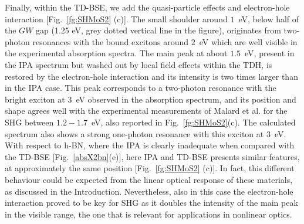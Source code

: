 Finally, within the TD-BSE, we add the quasi-particle effects and electron-hole interaction  [Fig.~\ref{fg:SHMoS2} (c)]. The small shoulder around $1$~eV, below half of the $GW$ gap (1.25 eV, grey dotted vertical line in the figure), originates from two-photon resonances with the bound excitons around $2$~eV which are well visible in the experimental absorption spectra.\cite{PhysRevLett.105.136805}  The main peak at about $1.5$~eV, present in the IPA spectrum but washed out by local field effects within the TDH, is restored by the electron-hole interaction and its intensity is two times larger than in the IPA case. This peak corresponds to a two-photon resonance with the bright exciton at 3~eV observed in the absorption spectrum,\cite{molina2013effect} and its position and shape agrees well with the experimental measurements of Malard et al.\cite{PhysRevB.87.201401} for the SHG between $1.2-1.7$~eV, also reported in Fig.~\ref{fg:SHMoS2}(c). The calculated spectrum also shows a strong one-photon resonance with this exciton at 3~eV.
With respect to h-BN, where the IPA is clearly inadequate when compared with the TD-BSE [Fig.~\ref{absX2bn}(e)], here IPA and TD-BSE  presents similar features, at approximately the same position [Fig.~\ref{fg:SHMoS2} (c)]. In fact, this different behaviour could be expected from the linear optical response of these materials, as discussed in the Introduction. Nevertheless, also in this case the electron-hole interaction proved to be key for SHG as it doubles the intensity of the main peak in the visible range, the one that is relevant for applications in nonlinear optics.      
